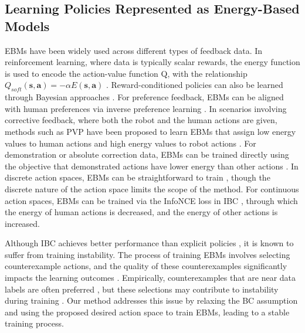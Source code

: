 \subsection{Learning Policies Represented as Energy-Based Models}
EBMs have been widely used across different types of feedback data.
In reinforcement learning, where data is typically scalar rewards, the energy function is used to encode the action-value function Q, with the relationship $ Q_{soft}(\bm s, \bm a) = - \alpha E(\bm s, \bm a) $ \cite{2017_soft_Q_learning, 2018_SAC, 2024_RAL_imperfect_demon}. 
Reward-conditioned policies can also be learned through Bayesian approaches \cite{2023_Bayesian_reprameterized_RCRL}. For preference feedback, EBMs can be aligned with human preferences via inverse preference learning \cite{2023_Inverse_Preference_learning}. 
In scenarios involving corrective feedback, where both the robot and the human actions are given, methods such as PVP have been proposed to learn EBMs that assign low energy values to human actions and high energy values to robot actions \cite{2023_NIPS_PVP}.
For demonstration or absolute correction data, EBMs can be trained directly using the objective that demonstrated actions have lower energy than other actions  \cite{2020_RSS_expert_interventio_learning, 2022_implicit_BC}.
In discrete action spaces, EBMs can be straightforward to train \cite{2020_RSS_expert_interventio_learning}, though the discrete nature of the action space limits the scope of the method. 
For continuous action spaces, EBMs can be trained
via the InfoNCE loss in IBC \cite{2022_implicit_BC}, through which the energy of human actions is decreased, and the energy of other actions is increased. 

Although IBC achieves better performance than explicit policies \cite{2022_implicit_BC}, it is known to suffer from training instability. The process of training EBMs involves selecting counterexample actions, and the quality of these counterexamples significantly impacts the learning outcomes \cite{2021_how_to_train_EBM,2020_flow_constrastive_estimation_EBM}. Empirically, counterexamples that are near data labels are often preferred \cite{2020_hard_negative_mixing_contrastive}, but these selections may contribute to instability during training \cite{2022_arxiv_IBC_gaps, 2023_diffusionpolicy}. Our method addresses this issue by relaxing the BC assumption and using the proposed desired action space to train EBMs, leading to a stable training process.


